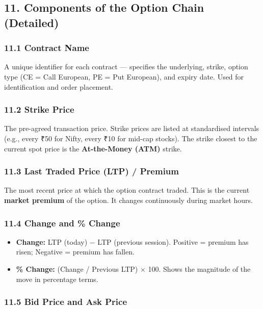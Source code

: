 \documentclass[12pt,openany]{book}
\begin{document}
\subsection{11. Components of the Option Chain (Detailed)}

\subsubsection{11.1 Contract Name}
A unique identifier for each contract — specifies the underlying, strike, option type (CE = Call European, PE = Put European), and expiry date. Used for identification and order placement.

\subsubsection{11.2 Strike Price}
The pre-agreed transaction price. Strike prices are listed at standardised intervals (e.g., every ₹50 for Nifty, every ₹10 for mid-cap stocks). The strike closest to the current spot price is the \textbf{At-the-Money (ATM)} strike.

\subsubsection{11.3 Last Traded Price (LTP) / Premium}
The most recent price at which the option contract traded. This is the current \textbf{market premium} of the option. It changes continuously during market hours.

\subsubsection{11.4 Change and \% Change}

\begin{itemize}[leftmargin=*]
    \item \textbf{Change:} LTP (today) − LTP (previous session). Positive = premium has risen; Negative = premium has fallen.
    \item \textbf{\% Change:} (Change / Previous LTP) × 100. Shows the magnitude of the move in percentage terms.
\end{itemize}

\subsubsection{11.5 Bid Price and Ask Price}
\end{document}
